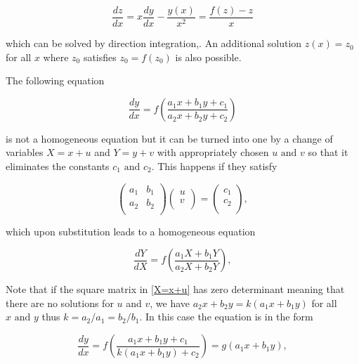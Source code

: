 \documentclass[english,a4paper,12pt]{report}
\begin{document}
\begin{equation}
    \frac{dz}{dx} = x\frac{dy}{dx} - \frac{y(x)}{x^2} = \frac{f(z)-z}{x}  
\end{equation}

which can be solved by direction integration,. An additional solution \(z(x) = z_0 \) for all \(x\) where \(z_0 \) satisfies \(z_0 = f(z_0 )\) is also possible.

The following equation

\begin{equation}
    \frac{dy}{dx} = f\left(\frac{a_1 x+b_1 y+c_1 }{a_2 x+b_2 y+c_2 } \right)
\end{equation}

is not a homogeneous equation but it can be turned into one by a change of variables \(X = x+u\) and \(Y = y+v\) with appropriately chosen \(u\text { and } v\) so that it eliminates the constants \(c_1 \text { and } c_2 \). This happens if they satisfy 

\begin{equation} \label{X=x+u} 
    \begin{pmatrix}
        a_1  &  b_1  \\
        a_2  &  b_2  \\
    \end{pmatrix} \begin{pmatrix}
         u \\
         v \\
    \end{pmatrix} = \begin{pmatrix}
         c_1  \\
        c_2   \\
    \end{pmatrix} ,
\end{equation}

which upon substitution leads to a homogeneous equation

\begin{equation}
    \frac{dY}{dX} = f\left( \frac{a_1 X+b_1 Y}{a_2 X+b_2 Y}  \right),
\end{equation}

Note that if the square matrix in \cref{X=x+u} has zero determinant meaning that there are no solutions for \(u\) and \(v\), we have \(a_2 x+b_2 y = k(a_1 x+b_1 y)\) for all \(x \text { and } y\) thus \( k=a_2 /a_1  = b_2 /b_1  \). In this case the equation is in the form

\begin{equation}
    \frac{dy}{dx} = f\left( \frac{a_1 x+b_1 y+c_1 }{k(a_1 x+b_1 y)+c_2 }  \right)= g(a_1 x+b_1 y),
\end{equation}
\end{document}
